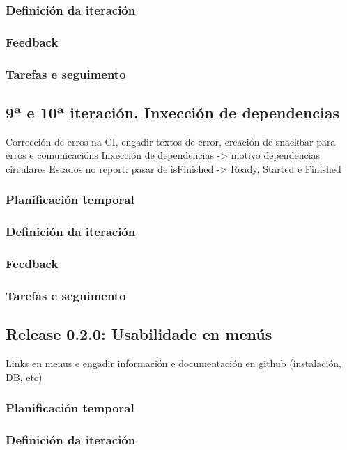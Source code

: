       \subsubsection{Definición da iteración}
      \subsubsection{Feedback}
      \subsubsection{Tarefas e seguimento}

    \subsection{9ª e 10ª iteración. Inxección de dependencias}
    Corrección de erros na CI, engadir textos de error, creación de snackbar para erros e comunicacións
    Inxección de dependencias -> motivo dependencias circulares
    Estados no report: pasar de isFinished -> Ready, Started e Finished
      \subsubsection{Planificación temporal}
      \subsubsection{Definición da iteración}
      \subsubsection{Feedback}
      \subsubsection{Tarefas e seguimento}

    \subsection{Release 0.2.0: Usabilidade en menús}
    Links en menus e engadir información e documentación en github (instalación, DB, etc)
      \subsubsection{Planificación temporal}
      \subsubsection{Definición da iteración}
